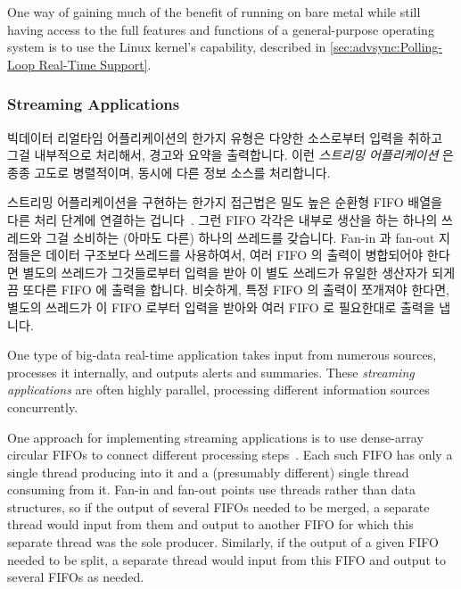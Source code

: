One way of gaining much of the benefit of running on bare metal while
still having access to the full features and functions of a
general-purpose operating system is to use the Linux kernel's
 capability, described in
\cref{sec:advsync:Polling-Loop Real-Time Support}.

\fi

\subsubsection{Streaming Applications}
\label{sec:advsync:Streaming Applications}

빅데이터 리얼타임 어플리케이션의 한가지 유형은 다양한 소스로부터 입력을 취하고
그걸 내부적으로 처리해서, 경고와 요약을 출력합니다.
이런 \emph{스트리밍 어플리케이션} 은 종종 고도로 병렬적이며, 동시에 다른 정보
소스를 처리합니다.

스트리밍 어플리케이션을 구현하는 한가지 접근법은 밀도 높은 순환형 FIFO 배열을
다른 처리 단계에 연결하는 겁니다~\cite{AdrianSutton2013LCA:Disruptor}.
그런 FIFO 각각은 내부로 생산을 하는 하나의 쓰레드와 그걸 소비하는 (아마도 다른)
하나의 쓰레드를 갖습니다.
Fan-in 과 fan-out 지점들은 데이터 구조보다 쓰레드를 사용하여서, 여러 FIFO 의
출력이 병합되어야 한다면 별도의 쓰레드가 그것들로부터 입력을 받아 이 별도
쓰레드가 유일한 생산자가 되게끔 또다른 FIFO 에 출력을 합니다.
비슷하게, 특정 FIFO 의 출력이 쪼개져야 한다면, 별도의 쓰레드가 이 FIFO 로부터
입력을 받아와 여러 FIFO 로 필요한대로 출력을 냅니다.

\iffalse

One type of big-data real-time application takes input from numerous
sources, processes it internally, and outputs alerts and summaries.
These \emph{streaming applications} are often highly parallel, processing
different information sources concurrently.

One approach for implementing streaming applications is to use
dense-array circular FIFOs to connect different processing
steps~\cite{AdrianSutton2013LCA:Disruptor}.
Each such FIFO has only a single thread producing into it and a
(presumably different) single thread consuming from it.
Fan-in and fan-out points use threads rather than data structures,
so if the output of several FIFOs needed to be merged, a separate
thread would input from them and output to another FIFO for which
this separate thread was the sole producer.
Similarly, if the output of a given FIFO needed to be split, a separate
thread would input from this FIFO and output to several FIFOs as needed.

